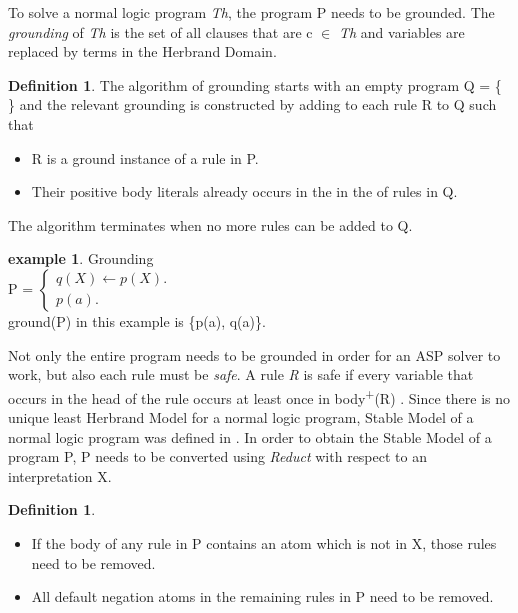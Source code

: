 \documentclass[12pt,twoside]{report}
\theoremstyle{plain}
\theoremstyle{definition}
\newtheorem{defn}[thm]{Definition} %
\newtheorem{examp}{example}[section]
\begin{document}
To solve a normal logic program \textit{Th}, the program P needs to be grounded. The \textit{grounding} of \textit{Th} is the set of all clauses that are c $\in$ \textit{Th} and variables are replaced by terms in the Herbrand Domain. 
\begin{defn}
The algorithm of grounding starts with an empty program Q = \{  \} and the relevant grounding is constructed by adding to each rule R to Q such that
\begin{itemize}
\item R is a ground instance of a rule in P.
\item Their positive body literals already occurs in the in the of rules in Q. 
\end{itemize}
The algorithm terminates when no more rules can be added to Q.

\end{defn}

\begin{examp} \normalfont Grounding \\

P = $\begin{cases}
	q(X)  \leftarrow p(X). \\
	p(a).
      \end{cases}$ \\

ground(P) in this example is \{p(a), q(a)\}.

\end{examp}
\label{grounding}

Not only the entire program needs to be grounded in order for an ASP solver to work, but also each rule must be \textit{safe}. A rule \textit{R} is safe if every variable that occurs in the head of the rule occurs at least once in body\textsuperscript{+}(R) .
Since there is no unique least Herbrand Model for a normal logic program, Stable Model of a normal logic program was defined in \cite{Gelfond1988}. In order to obtain the Stable Model of a program P, P needs to be converted using \textit{Reduct} with respect to an interpretation X. 
\begin{defn}
\begin{itemize}
The \textit{reduct} of P with respect to X can be constructed such that
\item If the body of any rule in P contains an atom which is not in X, those rules need to be removed. 
\item All default negation atoms in the remaining rules in P need to be removed.
\end{itemize}
\end{defn}
\end{document}
